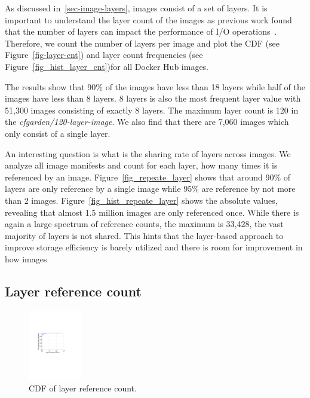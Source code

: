 As discussed in~\ref{sec-image-layers}, images consist of a set of layers.
It is important to understand the layer count of the images as previous
work found that the number of layers can impact the performance of
I/O operations~\cite{slacker}. Therefore, we count the number of layers
per image and plot the CDF (see Figure~\ref{fig-layer-cnt})
and layer count frequencies (see Figure~\ref{fig_hist_layer_cnt})for all
Docker Hub images.

The results show that 90\% of the images have less than 18 layers while
half of the images have less than 8 layers. 8 layers is also the most
frequent layer value with 51,300 images consisting of exactly 8 layers.
The maximum layer count is 120 in the \textit{cfgarden/120-layer-image}.
We also find that there are 7,060 images which only consist of a single layer.

%


An interesting question is what is the sharing rate of layers across images.
We analyze all image manifests and count for each layer, how many times it
is referenced by an image. Figure~\ref{fig_repeate_layer} shows that around 90\%
of layers are only reference by a single image while 95\% are reference by not
more than 2 images.
%
Figure~\ref{fig_hist_repeate_layer} shows the absolute values, revealing that
almost 1.5 million images are only referenced once. While there is again a large
spectrum of reference counts, the maximum is 33,428, the vast majority of layers
is not shared. This hints that the layer-based approach to improve storage
efficiency is barely utilized and there is room for improvement in how images

\subsection{Layer reference count}

\begin{figure}
	\centering
	\includegraphics[width=0.21\textwidth]{graphs/shared-cnt-cdf.pdf}
	\caption{CDF of layer reference count.
	}
	\label{fig:reference-cnt}
\end{figure}


